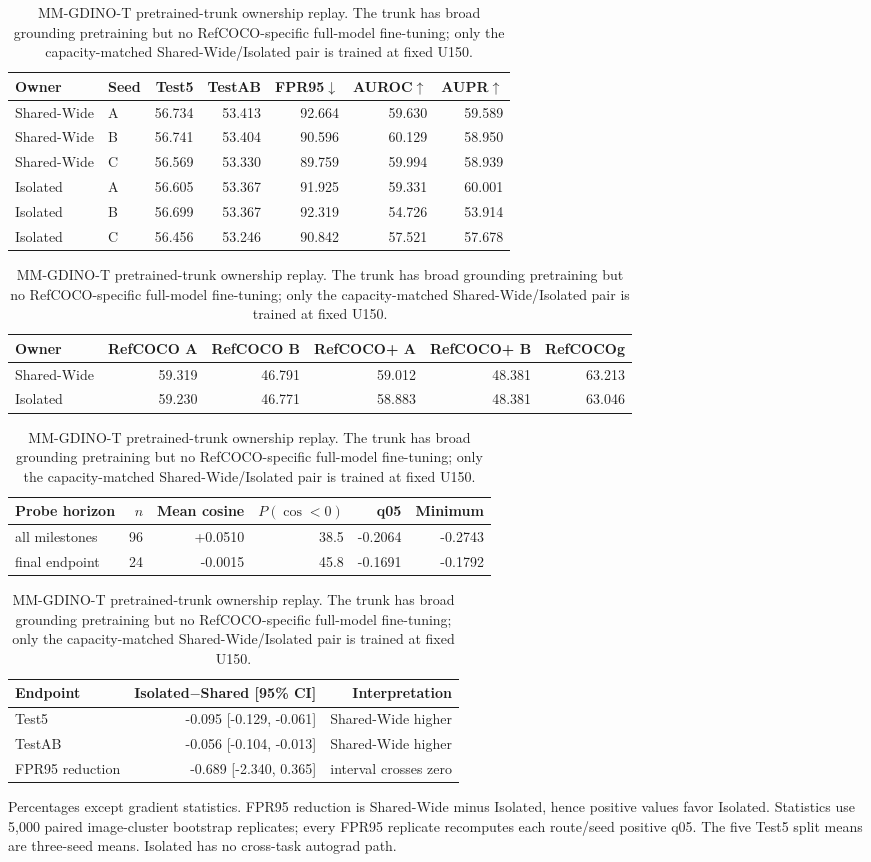 \begin{table}[t]
\centering
\caption{MM-GDINO-T pretrained-trunk ownership replay.  The trunk has broad
grounding pretraining but no RefCOCO-specific full-model fine-tuning; only the
capacity-matched Shared-Wide/Isolated pair is trained at fixed U150.}
\label{tab:supp-pretrain-ownership}
\scriptsize
\setlength{\tabcolsep}{3.2pt}
\begin{tabular}{llrrrrr}
\toprule
Owner & Seed & Test5 & TestAB & FPR95$\downarrow$ & AUROC$\uparrow$ & AUPR$\uparrow$\\
\midrule
Shared-Wide & A & 56.734 & 53.413 & 92.664 & 59.630 & 59.589 \\
Shared-Wide & B & 56.741 & 53.404 & 90.596 & 60.129 & 58.950 \\
Shared-Wide & C & 56.569 & 53.330 & 89.759 & 59.994 & 58.939 \\
Isolated & A & 56.605 & 53.367 & 91.925 & 59.331 & 60.001 \\
Isolated & B & 56.699 & 53.367 & 92.319 & 54.726 & 53.914 \\
Isolated & C & 56.456 & 53.246 & 90.842 & 57.521 & 57.678 \\
\bottomrule
\end{tabular}
\par\smallskip
\begin{tabular}{lrrrrr}
\toprule
Owner & RefCOCO A & RefCOCO B & RefCOCO+ A & RefCOCO+ B & RefCOCOg\\
\midrule
Shared-Wide & 59.319 & 46.791 & 59.012 & 48.381 & 63.213 \\
Isolated & 59.230 & 46.771 & 58.883 & 48.381 & 63.046 \\
\bottomrule
\end{tabular}
\par\smallskip
\begin{tabular}{lrrrrr}
\toprule
Probe horizon & $n$ & Mean cosine & $P(\cos<0)$ & q05 & Minimum\\
\midrule
all milestones & 96 & +0.0510 & 38.5 & -0.2064 & -0.2743 \\
final endpoint & 24 & -0.0015 & 45.8 & -0.1691 & -0.1792 \\
\bottomrule
\end{tabular}
\par\smallskip
\begin{tabular}{lrr}
\toprule
Endpoint & Isolated$-$Shared [95\% CI] & Interpretation\\
\midrule
Test5 & -0.095 [-0.129, -0.061] & Shared-Wide higher\\
TestAB & -0.056 [-0.104, -0.013] & Shared-Wide higher\\
FPR95 reduction & -0.689 [-2.340, 0.365] & interval crosses zero\\
\bottomrule
\end{tabular}
\parbox{0.98\textwidth}{\scriptsize Percentages except gradient statistics.
FPR95 reduction is Shared-Wide minus Isolated, hence positive values favor
Isolated. Statistics use 5,000 paired image-cluster bootstrap replicates; every
FPR95 replicate recomputes each route/seed positive q05. The five Test5 split
means are three-seed means. Isolated has no cross-task autograd path.}
\end{table}
